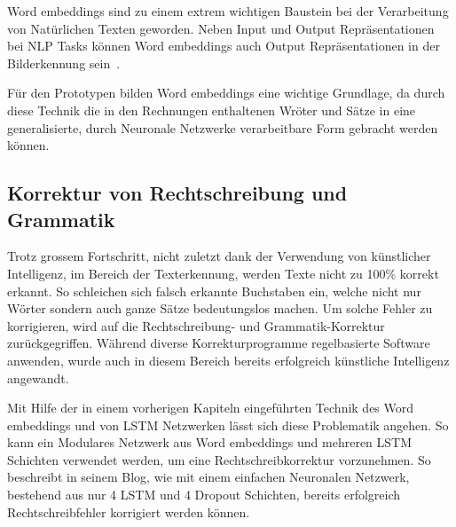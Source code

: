Word embeddings sind zu einem extrem wichtigen Baustein bei der Verarbeitung von Natürlichen Texten geworden. Neben Input und Output Repräsentationen bei NLP Tasks können Word embeddings auch Output Repräsentationen in der Bilderkennung sein~\autocite{Olah2014b}. 

Für den Prototypen bilden Word embeddings eine wichtige Grundlage, da durch diese Technik die in den Rechnungen enthaltenen Wröter und Sätze in eine generalisierte, durch Neuronale Netzwerke verarbeitbare Form gebracht werden können.

\subsection{Korrektur von Rechtschreibung und Grammatik}
\label{chap:grammar-correction}

Trotz grossem Fortschritt, nicht zuletzt dank der Verwendung von künstlicher Intelligenz, im Bereich der Texterkennung, werden Texte nicht zu 100\% korrekt erkannt. So schleichen sich falsch erkannte Buchstaben ein, welche nicht nur Wörter sondern auch ganze Sätze bedeutungslos machen. Um solche Fehler zu korrigieren, wird auf die Rechtschreibung- und Grammatik-Korrektur zurückgegriffen. Während diverse Korrekturprogramme regelbasierte Software anwenden, wurde auch in diesem Bereich bereits erfolgreich künstliche Intelligenz angewandt.

Mit Hilfe der in einem vorherigen Kapiteln eingeführten Technik des Word embeddings und von LSTM Netzwerken lässt sich diese Problematik angehen. So kann ein Modulares Netzwerk aus Word embeddings und mehreren LSTM Schichten verwendet werden, um eine Rechtschreibkorrektur vorzunehmen. So beschreibt \textcite{Weiss2016} in seinem Blog, wie mit einem einfachen Neuronalen Netzwerk, bestehend aus nur 4 LSTM und 4 Dropout Schichten, bereits erfolgreich Rechtschreibfehler korrigiert werden können. 

